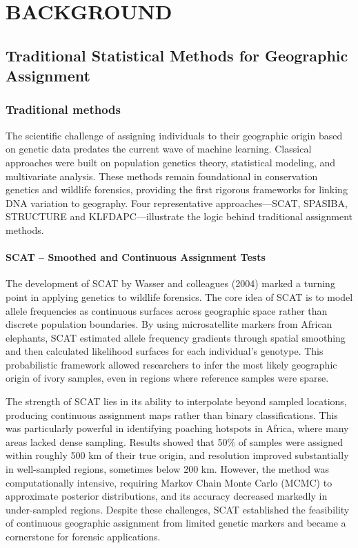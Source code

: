 \chapter{BACKGROUND}
\label{chap:background}

\section{Traditional Statistical Methods for Geographic Assignment}

\subsection{Traditional methods}

The scientific challenge of assigning individuals to their geographic origin based on genetic data predates the current wave of machine learning. Classical approaches were built on population genetics theory, statistical modeling, and multivariate analysis. These methods remain foundational in conservation genetics and wildlife forensics, providing the first rigorous frameworks for linking DNA variation to geography. Four representative approaches—SCAT, SPASIBA, STRUCTURE and KLFDAPC—illustrate the logic behind traditional assignment methods.

\subsubsection{SCAT – Smoothed and Continuous Assignment Tests}

The development of SCAT by Wasser and colleagues (2004) \cite{wasser2004assigning} marked a turning point in applying genetics to wildlife forensics. The core idea of SCAT is to model allele frequencies as continuous surfaces across geographic space rather than discrete population boundaries. By using microsatellite markers from African elephants, SCAT estimated allele frequency gradients through spatial smoothing and then calculated likelihood surfaces for each individual's genotype. This probabilistic framework allowed researchers to infer the most likely geographic origin of ivory samples, even in regions where reference samples were sparse.

The strength of SCAT lies in its ability to interpolate beyond sampled locations, producing continuous assignment maps rather than binary classifications. This was particularly powerful in identifying poaching hotspots in Africa, where many areas lacked dense sampling. Results showed that 50\% of samples were assigned within roughly 500 km of their true origin, and resolution improved substantially in well-sampled regions, sometimes below 200 km. However, the method was computationally intensive, requiring Markov Chain Monte Carlo (MCMC) to approximate posterior distributions, and its accuracy decreased markedly in under-sampled regions. Despite these challenges, SCAT established the feasibility of continuous geographic assignment from limited genetic markers and became a cornerstone for forensic applications.

